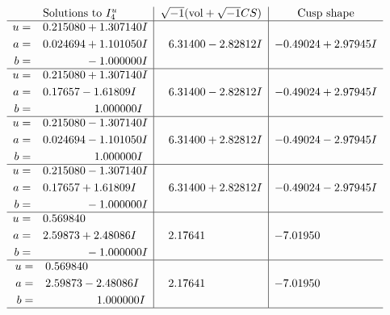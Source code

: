 \documentclass[1p]{elsarticle_modified}
\theoremstyle{definition}
\newcommand{\I}{\sqrt{-1}}
\begin{document}
$$\begin{array}{c|c|c}  
\text{Solutions to }I^u_{4}& \I (\text{vol} + \sqrt{-1}CS) & \text{Cusp shape}\\
 \hline 
\begin{aligned}
u &= \phantom{-}0.215080 + 1.307140 I \\
a &= \phantom{-}0.024694 + 1.101050 I \\
b &= \phantom{-0.000000 } -1.000000 I\end{aligned}
 & \phantom{-}6.31400 - 2.82812 I & -0.49024 + 2.97945 I \\ \hline\begin{aligned}
u &= \phantom{-}0.215080 + 1.307140 I \\
a &= \phantom{-}0.17657 - 1.61809 I \\
b &= \phantom{-0.000000 -}1.000000 I\end{aligned}
 & \phantom{-}6.31400 - 2.82812 I & -0.49024 + 2.97945 I \\ \hline\begin{aligned}
u &= \phantom{-}0.215080 - 1.307140 I \\
a &= \phantom{-}0.024694 - 1.101050 I \\
b &= \phantom{-0.000000 -}1.000000 I\end{aligned}
 & \phantom{-}6.31400 + 2.82812 I & -0.49024 - 2.97945 I \\ \hline\begin{aligned}
u &= \phantom{-}0.215080 - 1.307140 I \\
a &= \phantom{-}0.17657 + 1.61809 I \\
b &= \phantom{-0.000000 } -1.000000 I\end{aligned}
 & \phantom{-}6.31400 + 2.82812 I & -0.49024 - 2.97945 I \\ \hline\begin{aligned}
u &= \phantom{-}0.569840\phantom{ +0.000000I} \\
a &= \phantom{-}2.59873 + 2.48086 I \\
b &= \phantom{-0.000000 } -1.000000 I\end{aligned}
 & \phantom{-}2.17641\phantom{ +0.000000I} & -7.01950\phantom{ +0.000000I} \\ \hline\begin{aligned}
u &= \phantom{-}0.569840\phantom{ +0.000000I} \\
a &= \phantom{-}2.59873 - 2.48086 I \\
b &= \phantom{-0.000000 -}1.000000 I\end{aligned}
 & \phantom{-}2.17641\phantom{ +0.000000I} & -7.01950\phantom{ +0.000000I}\\
 \hline 
 \end{array}$$\newpage\newpage\renewcommand{\arraystretch}{1}
\end{document}
